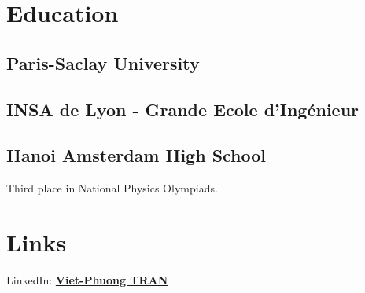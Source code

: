 \documentclass[]{deedy-resume-openfont}
\begin{document}
%
%
\lastupdated

%
%

%
%

\begin{minipage}[t]{0.30\textwidth} 


\section{Education} 

\subsection{Paris-Saclay University}
\sectionsep

\subsection{INSA de Lyon - Grande Ecole d'Ingénieur}

\sectionsep

\subsection{Hanoi Amsterdam High School}
Third place in National Physics Olympiads.
\sectionsep


\section{Links} 
LinkedIn: \href{https://www.linkedin.com/in/viet-phuong-tran-512a1887/}{\bf Viet-Phuong TRAN} \\



\end{minipage}
\end{document}

